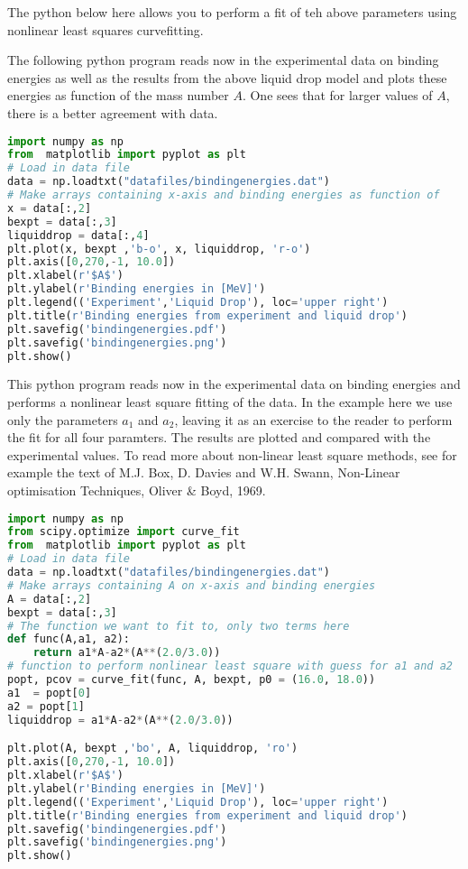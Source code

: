 \documentclass[graybox,sectrefs,envcountresetchap,open=right]{svmonodo}
\begin{document}
\noindent
The python below here allows you to perform a fit of teh above parameters using nonlinear least squares curvefitting.


The following python program reads now in the experimental data on binding energies as well as the results from the above liquid drop model and plots these energies as function of the mass number $A$. One sees that for larger values of $A$, there is a better agreement with data. 
\begin{lstlisting}[language=Python,style=blue1bar]
import numpy as np
from  matplotlib import pyplot as plt
# Load in data file
data = np.loadtxt("datafiles/bindingenergies.dat")
# Make arrays containing x-axis and binding energies as function of
x = data[:,2]
bexpt = data[:,3]
liquiddrop = data[:,4]
plt.plot(x, bexpt ,'b-o', x, liquiddrop, 'r-o')
plt.axis([0,270,-1, 10.0])
plt.xlabel(r'$A$')
plt.ylabel(r'Binding energies in [MeV]')
plt.legend(('Experiment','Liquid Drop'), loc='upper right')
plt.title(r'Binding energies from experiment and liquid drop')
plt.savefig('bindingenergies.pdf')
plt.savefig('bindingenergies.png')
plt.show()
\end{lstlisting}


This  python program reads now in the experimental data on binding energies and performs a nonlinear least square fitting of the data. In the example here we use only the parameters $a_1$ and $a_2$, leaving it as an exercise to the reader to perform the fit for all four paramters. The results are plotted and compared with the experimental values.  To read more about non-linear least square methods, see for example the text of M.J. Box, D. Davies and W.H. Swann, Non-Linear optimisation Techniques, Oliver {\&} Boyd, 1969.
\begin{lstlisting}[language=Python,style=blue1bar]
import numpy as np
from scipy.optimize import curve_fit
from  matplotlib import pyplot as plt
# Load in data file
data = np.loadtxt("datafiles/bindingenergies.dat")
# Make arrays containing A on x-axis and binding energies
A = data[:,2]
bexpt = data[:,3]
# The function we want to fit to, only two terms here
def func(A,a1, a2):
    return a1*A-a2*(A**(2.0/3.0))
# function to perform nonlinear least square with guess for a1 and a2
popt, pcov = curve_fit(func, A, bexpt, p0 = (16.0, 18.0))
a1  = popt[0]
a2 = popt[1]
liquiddrop = a1*A-a2*(A**(2.0/3.0))

plt.plot(A, bexpt ,'bo', A, liquiddrop, 'ro')
plt.axis([0,270,-1, 10.0])
plt.xlabel(r'$A$')
plt.ylabel(r'Binding energies in [MeV]')
plt.legend(('Experiment','Liquid Drop'), loc='upper right')
plt.title(r'Binding energies from experiment and liquid drop')
plt.savefig('bindingenergies.pdf')
plt.savefig('bindingenergies.png')
plt.show()
\end{lstlisting}
\end{document}
